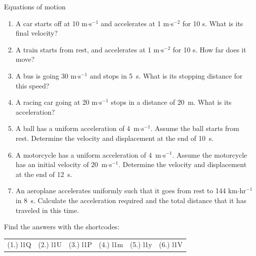 \begin{exercises}{Equations of motion}
            \nopagebreak
          \label{m38796*id79517}\begin{enumerate}[noitemsep, label=\textbf{\arabic*}. ] 
            \label{m38796*uid144}\item A car starts off at 10 m$\ensuremath{\cdot}$s${}^{-1}$ and accelerates at 1 m$\ensuremath{\cdot}$s${}^{-2}$ for 10 s. What is its final velocity?\newline
\label{m38796*uid145}\item A train starts from rest, and accelerates at 1 m$\ensuremath{\cdot}$s${}^{-2}$ for 10 s. How far does it move?\newline
\label{m38796*uid146}\item A bus is going 30 m$\ensuremath{\cdot}$s${}^{-1}$ and stops in 5~s. What is its stopping distance for this speed?\newline
\label{m38796*uid147}\item A racing car going at 20 m$\ensuremath{\cdot}$s${}^{-1}$ stops in a distance of 20~m. What is its acceleration?\newline
\label{m38796*uid148}\item A ball has a uniform acceleration of 4~m$\ensuremath{\cdot}$s${}^{-1}$. Assume the ball starts from rest. Determine the velocity and displacement at the end of 10~s.\newline
\label{m38796*uid149}\item A motorcycle has a uniform acceleration of 4~m$\ensuremath{\cdot}$s${}^{-1}$. Assume the motorcycle has an initial velocity of 20~m$\ensuremath{\cdot}$s${}^{-1}$. Determine the velocity and displacement at the end of 12~s.\newline
\label{m38796*uid150}\item An aeroplane accelerates uniformly such that it goes from rest to 144 km$\ensuremath{\cdot}$hr${}^{-1}$in 8~s. Calculate the acceleration required and the total distance that it has traveled in this time.\newline
\end{enumerate}
    \label{m38796*cid11}
\par {} Find the answers with the shortcodes:
 \par \begin{tabular}[h]{cccccc}
 (1.) l1Q  &  (2.) l1U  &  (3.) l1P  &  (4.) l1m  &  (5.) l1y  &  (6.) l1V  & \end{tabular}
\end{exercises}
